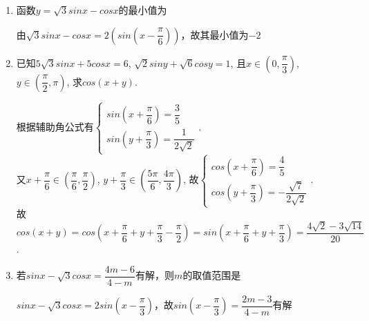 \begin{enumerate}
\begin{enumerate}
        \item 函数$y = \sqrt{3}sinx - cosx$的最小值为
        \begin{jieda}
            由$\sqrt{3}sinx - cosx = 2(sin(x-\dfrac{\pi}{6}))$，故其最小值为$-2$
        \end{jieda}
       \item 已知$5\sqrt{3}sin{x}+5cos{x}=6$, $\sqrt{2}sin{y}+\sqrt{6}cos{y}=1$, 
        且$x\in\left(0,\dfrac{\pi}{3}\right)$, $y\in\left(\dfrac{\pi}{2},\pi\right)$, 
        求$cos(x+y)$. 
        \begin{jieda}
        根据辅助角公式有$\begin{cases}
        sin(x+\dfrac{\pi}{6})=\dfrac{3}{5}\\
        sin(y+\dfrac{\pi}{3})=\dfrac{1}{2\sqrt{2}}
        \end{cases}$. \\
        又$x+\dfrac{\pi}{6}\in(\dfrac{\pi}{6},\dfrac{\pi}{2})$, $y+\dfrac{\pi}{3}\in(\dfrac{5\pi}{6}, \dfrac{4\pi}{3})$, 
        故$\begin{cases}
        cos(x+\dfrac{\pi}{6})=\dfrac{4}{5}\\
        cos(y+\dfrac{\pi}{3})=-\dfrac{\sqrt{7}}{2\sqrt{2}}
        \end{cases}$. \\
        故$cos(x+y)=cos(x+\dfrac{\pi}{6}+y+\dfrac{\pi}{3}-\dfrac{\pi}{2})=sin(x+\dfrac{\pi}{6}+y+\dfrac{\pi}{3})=\dfrac{4\sqrt{2}-3\sqrt{14}}{20}$. 
        \end{jieda}
        \item 若$sinx - \sqrt{3}cosx = \dfrac{4m-6}{4-m}$有解，则$m$的取值范围是
        \begin{jieda}
            $sinx - \sqrt{3}cosx = 2sin\left(x-\dfrac{\pi}{3}\right)$，故$sin\left(x-\dfrac{\pi}{3}\right) = \dfrac{2m-3}{4-m}$有解\\

\end{jieda}
\end{enumerate}
\end{enumerate}
